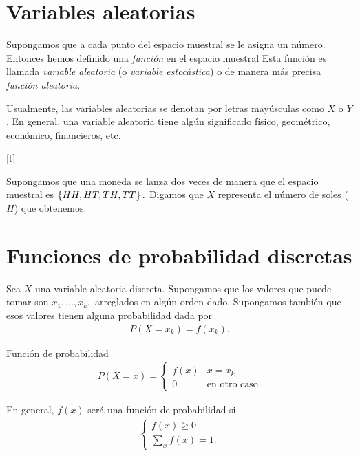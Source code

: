 

\tableofcontents


\section{Variables aleatorias}

Supongamos que a cada punto del espacio muestral se le asigna un número.  Entonces hemos definido una \emph{función} en el espacio muestral  Esta función es llamada \emph{variable aleatoria} (o \emph{variable estocástica}) o de manera más precisa \emph{función aleatoria}. 


Usualmente, las variables aleatorias se denotan por letras mayúsculas como $X$ o $Y$. En general, una variable aleatoria tiene algún significado físico, geométrico, económico, financieros, etc.


[t]
\begin{ejemplo}
  \label{exmp:2.1}
Supongamos que una moneda se lanza dos veces de manera que el espacio muestral es $\left\{ HH,HT,TH,TT \right\}.$  Digamos que $X$ representa el número de soles ($H$) que obtenemos.
\end{ejemplo}


\section{Funciones de probabilidad discretas}

 Sea $X$ una variable aleatoria discreta.  Supongamos que los valores que puede tomar son $x_{1},...,x_{k},$ arreglados en algún orden dado.  Supongamos también que esos valores
 tienen alguna probabilidad dada por
 \begin{align}
 \label{2.1}
 	P(X=x_{k})=f(x_{k}).
 \end{align}


{Función de probabilidad}
\begin{align}
\label{2.2}
P(X=x)=
\begin{cases}
f(x) & x=x_{k} \\
0	& \text{en otro caso}
\end{cases}
\end{align}



	En general, $f(x)$ será una función de probabilidad si
	\begin{align*}
		\begin{cases}
			f(x)\geq 0 \\
			\sum_{x}f(x)=1.
		\end{cases}
	\end{align*}



